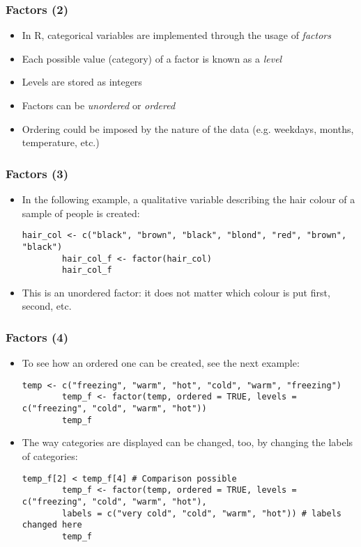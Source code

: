 \documentclass[10pt]{beamer}
\theoremstyle{definition}
\begin{document}
\begin{frame}[fragile]
	\frametitle{Factors (2)}
	\begin{itemize}
		\item In R, categorical variables are implemented through the usage of \textit{factors}
		
		\item Each possible value (category) of a factor is known as a \textit{level}
		
		\item Levels are stored as integers
		
		\item Factors can be \textit{unordered} or \textit{ordered}
		
		\item Ordering could be imposed by the nature of the data (e.g. weekdays, months, temperature, etc.)
	\end{itemize}
\end{frame}

\begin{frame}[fragile]
	\frametitle{Factors (3)}
	\begin{itemize}
		\item In the following example, a qualitative variable describing the hair colour of a sample of people is created:
		\begin{lstlisting}[style = rstyle, breaklines]
		hair_col <- c("black", "brown", "black", "blond", "red", "brown", "black")
		hair_col_f <- factor(hair_col)
		hair_col_f
		\end{lstlisting}
	
		\item This is an unordered factor: it does not matter which colour is put first, second, etc.
	\end{itemize}
\end{frame}

\begin{frame}[fragile]
	\frametitle{Factors (4)}
	\begin{itemize}
		\item To see how an ordered one can be created, see the next example:
		\begin{lstlisting}[style = rstyle, breaklines]
		temp <- c("freezing", "warm", "hot", "cold", "warm", "freezing")
		temp_f <- factor(temp, ordered = TRUE, levels = c("freezing", "cold", "warm", "hot"))
		temp_f
		\end{lstlisting}
	
		\item The way categories are displayed can be changed, too, by changing the labels of categories:
		\begin{lstlisting}[style = rstyle, breaklines]
		temp_f[2] < temp_f[4] # Comparison possible
		temp_f <- factor(temp, ordered = TRUE, levels = c("freezing", "cold", "warm", "hot"),
		labels = c("very cold", "cold", "warm", "hot")) # labels changed here
		temp_f 
		\end{lstlisting}
	\end{itemize}
\end{frame}
\end{document}
